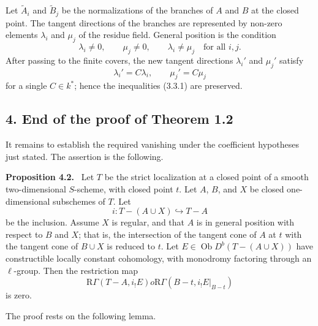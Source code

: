 \documentclass[11pt]{article}
\theoremstyle{plain}
\theoremstyle{definition}
\theoremstyle{remark}
\newenvironment{statement}[1]{\par\medskip\noindent\textbf{#1.}\ }{\par\medskip}
\DeclareMathOperator{\ob}{Ob}
\newcommand{\R}{\mathrm R}
\begin{document}
Let $\widetilde A_i$ and $\widetilde B_j$ be the normalizations of the branches of $A$ and $B$ at the closed point. The tangent directions of the branches are represented by non-zero elements $\lambda_i$ and $\mu_j$ of the residue field. General position is the condition
\begin{equation}
   \lambda_i\ne0,
   \qquad
   \mu_j\ne0,
   \qquad
   \lambda_i\ne\mu_j
   \quad\text{for all }i,j.
   \tag{3.3.1}
\end{equation}
After passing to the finite covers, the new tangent directions $\lambda_i'$ and $\mu_j'$ satisfy
\[
   \lambda_i'=C\lambda_i,
   \qquad
   \mu_j'=C\mu_j
\]
for a single $C\in k^*$; hence the inequalities (3.3.1) are preserved.

\subsection*{4. End of the proof of Theorem 1.2}
It remains to establish the required vanishing under the coefficient hypotheses just stated. The assertion is the following.

\begin{statement}{Proposition 4.2}
Let $T$ be the strict localization at a closed point of a smooth two-dimensional $S$-scheme, with closed point $t$. Let $A$, $B$, and $X$ be closed one-dimensional subschemes of $T$. Let
\[
   i:T-(A\cup X)\hookrightarrow T-A
\]
be the inclusion. Assume $X$ is regular, and that $A$ is in general position with respect to $B$ and $X$; that is, the intersection of the tangent cone of $A$ at $t$ with the tangent cone of $B\cup X$ is reduced to $t$. Let $E\in\ob D^b(T-(A\cup X))$ have constructible locally constant cohomology, with monodromy factoring through an $\ell$-group. Then the restriction map
\[
   \R\Gamma(T-A,i_!E)	o \R\Gamma(B-t,i_!E|_{B-t})
\]
is zero.
\end{statement}

The proof rests on the following lemma.
\end{document}
